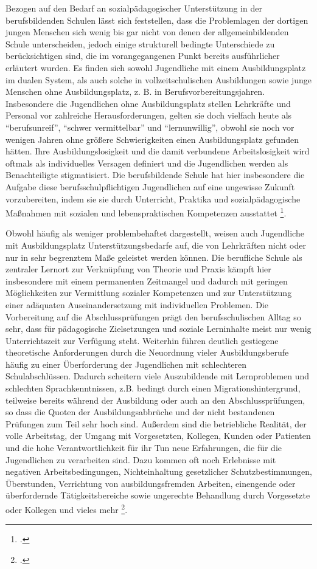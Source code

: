 Bezogen auf den Bedarf an sozialpädagogischer Unterstützung in der berufsbildenden Schulen lässt sich feststellen, dass die Problemlagen der dortigen jungen Menschen sich wenig bis gar nicht von denen der allgemeinbildenden Schule unterscheiden, jedoch einige strukturell bedingte Unterschiede zu berücksichtigen sind, die im vorangegangenen Punkt bereits ausführlicher erläutert wurden. Es finden sich sowohl Jugendliche mit einem Ausbildungsplatz im dualen System, als auch solche in vollzeitschulischen Ausbildungen sowie junge Menschen ohne Ausbildungsplatz, z. B. in Berufsvorbereitungsjahren. Insbesondere die Jugendlichen ohne Ausbildungsplatz stellen Lehrkräfte und Personal vor zahlreiche Herausforderungen, gelten sie doch vielfach heute als "`berufsunreif"', "`schwer vermittelbar"' und "`lernunwillig"', obwohl sie noch vor wenigen Jahren ohne größere Schwierigkeiten einen Ausbildungsplatz gefunden hätten. Ihre Ausbildungslosigkeit und die damit verbundene Arbeitslosigkeit wird oftmals als individuelles Versagen definiert und die Jugendlichen werden als Benachteiligte stigmatisiert. Die berufsbildende Schule hat hier insbesondere die Aufgabe diese berufsschulpflichtigen Jugendlichen auf eine ungewisse Zukunft vorzubereiten, indem sie sie durch Unterricht, Praktika und sozialpädagogische Maßnahmen mit sozialen und lebenspraktischen Kompetenzen ausstattet \footcite[vgl.][6]{ASSB2011}. 

Obwohl häufig als weniger problembehaftet dargestellt, weisen auch Jugendliche mit Ausbildungsplatz Unterstützungsbedarfe auf, die von Lehrkräften nicht oder nur in sehr begrenztem Maße geleistet werden können. Die berufliche Schule als zentraler Lernort zur Verknüpfung von Theorie und Praxis kämpft hier insbesondere mit einem permanenten Zeitmangel und dadurch mit geringen Möglichkeiten zur Vermittlung sozialer Kompetenzen und zur Unterstützung einer adäquaten Auseinandersetzung mit individuellen Problemen. Die Vorbereitung auf die Abschlussprüfungen prägt den berufsschulischen Alltag so sehr, dass für pädagogische Zielsetzungen und soziale Lerninhalte meist nur wenig Unterrichtszeit zur Verfügung steht. Weiterhin führen deutlich gestiegene theoretische Anforderungen durch die Neuordnung vieler Ausbildungsberufe häufig zu einer Überforderung der Jugendlichen mit schlechteren Schulabschlüssen. Dadurch scheitern viele Auszubildende mit Lernproblemen und schlechten Sprachkenntnissen, z.B. bedingt durch einen Migrationshintergrund, teilweise bereits während der Ausbildung oder auch an den Abschlussprüfungen, so dass die Quoten der Ausbildungsabbrüche und der nicht bestandenen Prüfungen zum Teil sehr hoch sind. Außerdem sind die betriebliche Realität, der volle Arbeitstag, der Umgang mit Vorgesetzten, Kollegen, Kunden oder Patienten und die hohe Verantwortlichkeit für ihr Tun neue Erfahrungen, die für die Jugendlichen zu verarbeiten sind. Dazu kommen oft noch Erlebnisse mit negativen Arbeitsbedingungen, Nichteinhaltung gesetzlicher Schutzbestimmungen, Überstunden, Verrichtung von ausbildungsfremden Arbeiten, einengende oder überfordernde Tätigkeitsbereiche sowie ungerechte Behandlung durch Vorgesetzte oder Kollegen und vieles mehr \footcite[vgl.][7]{ASSB2011}. 

